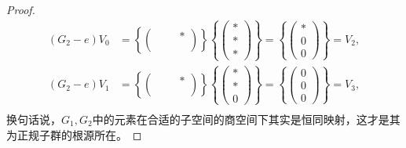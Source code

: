 \begin{enumerate}
\begin{proof}
\begin{align*}
    (G_2-e)V_0&=\left\{\begin{pmatrix}\ &\ &*\\ & & \\ & & \end{pmatrix}\right\}\left\{\begin{pmatrix}*\\*\\*\end{pmatrix}\right\}=\left\{\begin{pmatrix}*\\0\\0\end{pmatrix}\right\}=V_2,\\
    (G_2-e)V_1&=\left\{\begin{pmatrix}\ &\ &*\\ & & \\ & & \end{pmatrix}\right\}\left\{\begin{pmatrix}*\\*\\0\end{pmatrix}\right\}=\left\{\begin{pmatrix}0\\0\\0\end{pmatrix}\right\}=V_3,\\
    \end{align*}
    换句话说，$G_1,G_2$中的元素在合适的子空间的商空间下其实是恒同映射，这才是其为正规子群的根源所在。
    

\end{proof}
\end{enumerate}
